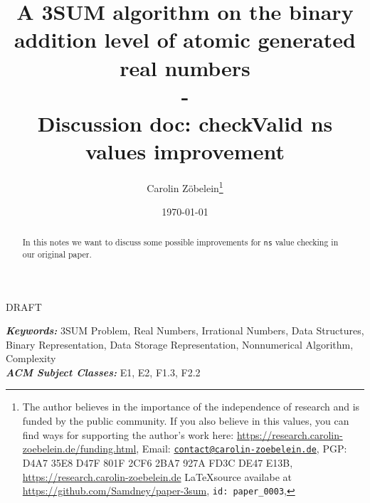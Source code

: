 \documentclass{article}
\newtheorem*{theorem A}{Theorem A}
\newtheorem*{theorem B}{N\"olker's Theorem}
\theoremstyle{remark}
\theoremstyle{remark}
\begin{document}
\title{A 3SUM algorithm on the binary addition level of atomic generated real numbers\\
-\\
Discussion doc: checkValid ns values improvement}
\author{Carolin Z\"obelein\thanks{The author believes in the importance of the independence of research and is funded by the public community. If you also believe in this values, you can find ways for supporting the author's work here: \url{https://research.carolin-zoebelein.de/funding.html}, Email: \href{mailto:contact@carolin-zoebelein.de}{\texttt{contact@carolin-zoebelein.de}}, PGP: D4A7 35E8 D47F 801F 2CF6 2BA7 927A FD3C DE47 E13B, \url{https://research.carolin-zoebelein.de} \LaTeX source availabe at \url{https://github.com/Samdney/paper-3sum}, \texttt{id: paper\_0003}, \Cooley}}
\date{\today}
\maketitle
\begin{center}
    DRAFT
\end{center}
\begin{abstract}
    In this notes we want to discuss some possible improvements for \texttt{ns} value checking in our original paper.
\end{abstract}
\providecommand{\keywords}[1]{\small{\textbf{\textit{Keywords:}} #1}}
\providecommand{\Classification}[1]{\small{\textbf{\textit{ACM Subject Classes:}} #1}}

\begin{flushleft}
    \keywords{3SUM Problem, Real Numbers, Irrational Numbers, Data Structures, Binary Representation, Data Storage Representation, Nonnumerical Algorithm, Complexity}\\
    \Classification{E1, E2, F1.3, F2.2}
\end{flushleft}
\tableofcontents
\end{document}

